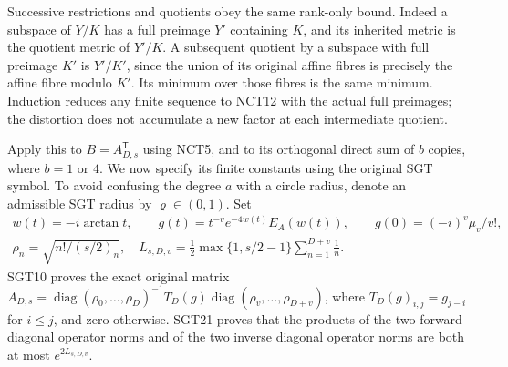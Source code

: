 \documentclass[11pt,a4paper]{article}
\begin{document}
Successive restrictions and quotients obey the same rank-only bound.
Indeed a subspace of \(Y/K\) has a full preimage \(Y'\) containing
\(K\), and its inherited metric is the quotient metric of \(Y'/K\).
A subsequent quotient by a subspace with full preimage \(K'\)
is \(Y'/K'\), since the union of its original affine fibres is
precisely the affine fibre modulo \(K'\).  Its minimum over those
fibres is the same minimum.  Induction reduces any finite sequence
to NCT12 with the actual full preimages; the distortion does not
accumulate a new factor at each intermediate quotient.

Apply this to \(B=A_{D,s}^{\mathsf T}\) using NCT5, and to its
orthogonal direct sum of \(b\) copies, where \(b=1\) or \(4\).
We now specify its finite constants using the original SGT symbol.
To avoid confusing the degree \(a\) with a circle radius, denote
an admissible SGT radius by \(\varrho\in(0,1)\).
Set
\[
\begin{gathered}
 w(t)=-i\arctan t,\qquad
 g(t)=t^{-v}e^{-4w(t)}E_A(w(t)),
 \qquad g(0)=(-i)^v\mu_v/v!,\\
 \rho_n=\sqrt{n!/(s/2)_n},\quad
 L_{s,D,v}=\tfrac12\max\{1,s/2-1\}\sum_{n=1}^{D+v}\frac1n.
\end{gathered}\tag{NCT15}
\]
SGT10 proves the exact original matrix
\(A_{D,s}=\operatorname{diag}(\rho_0,\ldots,\rho_D)^{-1}
 T_D(g)\operatorname{diag}(\rho_v,\ldots,\rho_{D+v})\),
where \(T_D(g)_{i,j}=g_{j-i}\) for \(i\le j\), and zero otherwise.
SGT21 proves that the products of the two forward diagonal operator
norms and of the two inverse diagonal operator norms are both at
most \(e^{2L_{s,D,v}}\).
\end{document}

